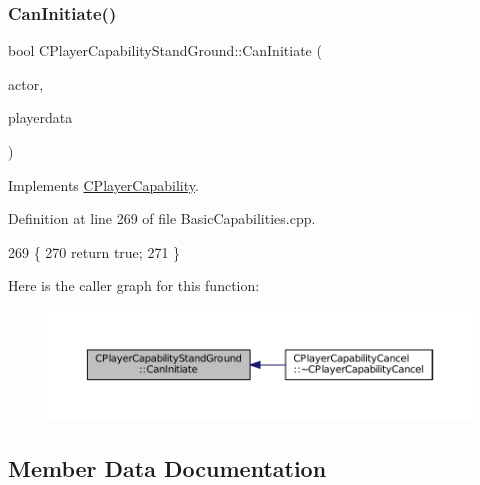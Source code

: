 \subsubsection{\texorpdfstring{Can\+Initiate()}{CanInitiate()}}
{\footnotesize\ttfamily bool C\+Player\+Capability\+Stand\+Ground\+::\+Can\+Initiate (\begin{DoxyParamCaption}\item[{std\+::shared\+\_\+ptr$<$ \hyperlink{classCPlayerAsset}{C\+Player\+Asset} $>$}]{actor,  }\item[{std\+::shared\+\_\+ptr$<$ \hyperlink{classCPlayerData}{C\+Player\+Data} $>$}]{playerdata }\end{DoxyParamCaption})\hspace{0.3cm}{\ttfamily [virtual]}}



Implements \hyperlink{classCPlayerCapability_aa83b1e1fcaff2985c378132d679154ea}{C\+Player\+Capability}.



Definition at line 269 of file Basic\+Capabilities.\+cpp.


\begin{DoxyCode}
269                                                                                                            
                     \{
270     \textcolor{keywordflow}{return} \textcolor{keyword}{true};
271 \}
\end{DoxyCode}
Here is the caller graph for this function\+:\nopagebreak
\begin{figure}[H]
\begin{center}
\leavevmode
\includegraphics[width=350pt]{classCPlayerCapabilityStandGround_a5567bfa47166f4080bd2b86f5c33e29c_icgraph}
\end{center}
\end{figure}


\subsection{Member Data Documentation}
\hypertarget{classCPlayerCapabilityStandGround_a7e89ffa413cea60b2f3c923fe5f44201}{}\label{classCPlayerCapabilityStandGround_a7e89ffa413cea60b2f3c923fe5f44201} 
